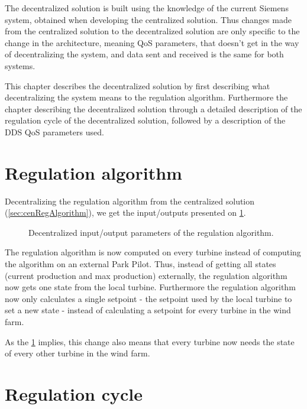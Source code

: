 \noindent The decentralized solution is built using the knowledge of the current Siemens system, obtained when developing the centralized solution. Thus changes made from the centralized solution to the decentralized solution are only specific to the change in the architecture, meaning QoS parameters, that doesn't get in the way of decentralizing the system, and data sent and received is the same for both systems.

This chapter describes the decentralized solution by first describing what decentralizing the system means to the regulation algorithm. Furthermore the chapter describing the decentralized solution through a detailed description of the regulation cycle of the decentralized solution, followed by a description of the DDS QoS parameters used. 

\section{Regulation algorithm}

Decentralizing the regulation algorithm from the centralized solution (\cref{sec:cenRegAlgorithm}), we get the input/outputs presented on \cref{fig:ioDecenRegAlg}.

\begin{figure}
	\centering
	

	\caption[Decentralized input/output parameters of the regulation algorithm]{
		\label{fig:ioDecenRegAlg} 
		\footnotesize{%
			Decentralized input/output parameters of the regulation algorithm.
		}
	}
\end{figure}

The regulation algorithm is now computed on every turbine instead of computing the algorithm on an external Park Pilot. Thus, instead of getting all states (current production and max production) externally, the regulation algorithm now gets one state from the local turbine. Furthermore the regulation algorithm now only calculates a single setpoint - the setpoint used by the local turbine to set a new state - instead of calculating a setpoint for every turbine in the wind farm.

As the \cref{fig:ioDecenRegAlg} implies, this change also means that every turbine now needs the state of every other turbine in the wind farm.

\section{Regulation cycle}

